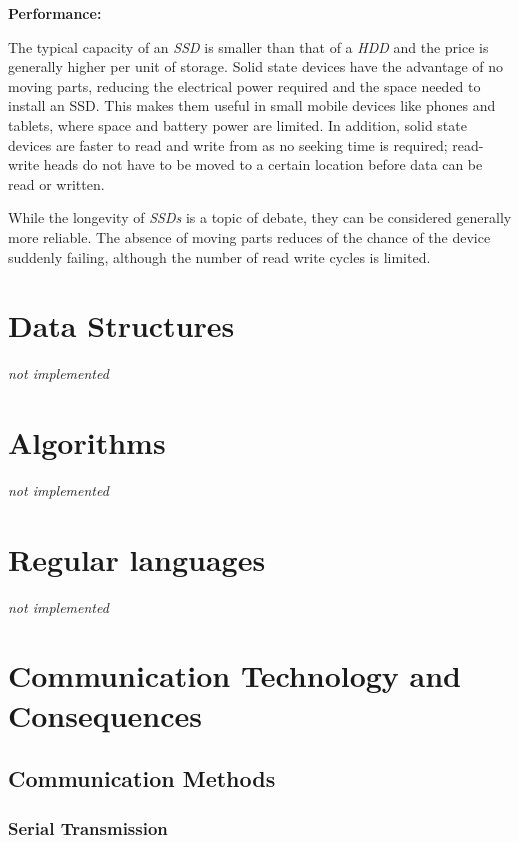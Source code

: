 \documentclass[9pt]{article}
\let\oldsection\section
\renewcommand\section{\clearpage\oldsection}
\begin{document}
\textbf{Performance:}

The typical capacity of an \emph{SSD} is smaller than that of a \emph{HDD} and the price is generally higher per unit of storage. Solid state devices have the advantage of no moving parts, reducing the electrical power required and the space needed to install an SSD. This makes them useful in small mobile devices like phones and tablets, where space and battery power are limited. In addition, solid state devices are faster to read and write from as no seeking time is required; read-write heads do not have to be moved to a certain location before data can be read or written.

While the longevity of \emph{SSDs} is a topic of debate, they can be considered generally more reliable. The absence of moving parts reduces of the chance of the device suddenly failing, although the number of read write cycles is limited.

\section{Data Structures}
\label{sec:org024b900}

\emph{not implemented}

\section{Algorithms}
\label{sec:org5dbbef0}

\emph{not implemented}

\section{Regular languages}
\label{sec:orgafb316c}

\emph{not implemented}

\section{Communication Technology and Consequences}
\label{sec:org104f548}
\subsection{Communication Methods}
\label{sec:org3216565}
\subsubsection{Serial Transmission}
\label{sec:org13abcce}
\end{document}
